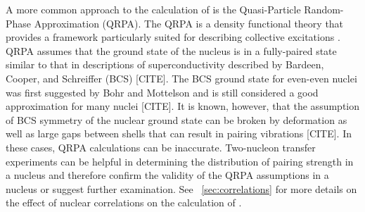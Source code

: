 A more common approach to the calculation of \NME is the Quasi-Particle Random-Phase Approximation (QRPA).  The QRPA is a density functional theory that provides a framework particularly suited for describing collective excitations \cite{Casten}.  QRPA assumes that the ground state of the nucleus is in a fully-paired state \cite{BenderSCMF} similar to that in descriptions of superconductivity described by Bardeen, Cooper, and Schreiffer (BCS) [CITE].  The BCS ground state for even-even nuclei was first suggested by Bohr and Mottelson \cite{nucleiBCS} and is still considered a good approximation for many nuclei [CITE].  It is known, however, that the assumption of BCS symmetry of the nuclear ground state can be broken by deformation as well as large gaps between shells that can result in pairing vibrations [CITE].  In these cases, QRPA calculations can be inaccurate.  Two-nucleon transfer experiments can be helpful in determining the distribution of pairing strength in a nucleus \cite{Yoshida} and therefore confirm the validity of the QRPA assumptions in a nucleus or suggest further examination.  See {\sect}~\ref{sec:correlations} for more details on the effect of nuclear correlations on the calculation of \NME. 

